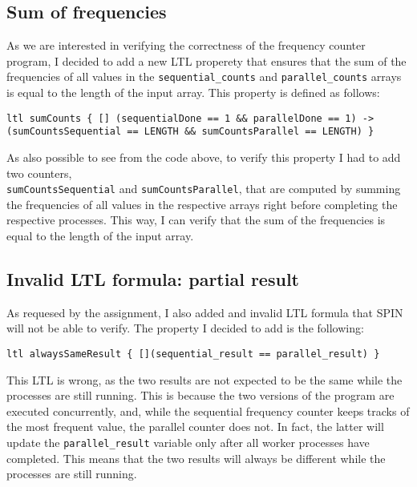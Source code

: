 \documentclass[a4paper, 11pt]{article}
\begin{document}
\subsection{Sum of frequencies}

As we are interested in verifying the correctness of the frequency counter program, I decided to add a new LTL properety that ensures that the sum of the frequencies of all values in the \texttt{sequential\_counts} and \texttt{parallel\_counts} arrays is equal to the length of the input array. This property is defined as follows:

\begin{lstlisting}[language=Promela, caption={LTL properties to verify the sum of frequencies in the sequential and parallel arrays}, captionpos=b, breaklines=true]
ltl sumCounts { [] (sequentialDone == 1 && parallelDone == 1) -> (sumCountsSequential == LENGTH && sumCountsParallel == LENGTH) }
\end{lstlisting}

As also possible to see from the code above, to verify this property I had to add two counters, \\ \texttt{sumCountsSequential} and \texttt{sumCountsParallel}, that are computed by summing the frequencies of all values in the respective arrays right before completing the respective processes. This way, I can verify that the sum of the frequencies is equal to the length of the input array.

\subsection{Invalid LTL formula: partial result}

As requesed by the assignment, I also added and invalid LTL formula that SPIN will not be able to verify. The property I decided to add is the following:

\begin{lstlisting}[language=Promela, caption={Invalid LTL property that SPIN will not be able to verify}, captionpos=b, breaklines=true]
ltl alwaysSameResult { [](sequential_result == parallel_result) }
\end{lstlisting}

This LTL is wrong, as the two results are not expected to be the same while the processes are still running. This is because the two versions of the program are executed concurrently, and, while the sequential frequency counter keeps tracks of the most frequent value, the parallel counter does not. In fact, the latter will update the \texttt{parallel\_result} variable only after all worker processes have completed. This means that the two results will always be different while the processes are still running.
\end{document}

